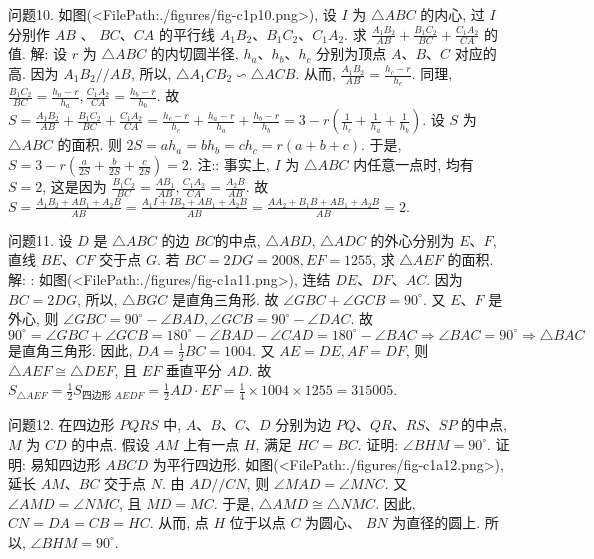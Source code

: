 问题10. 如图(<FilePath:./figures/fig-c1p10.png>), 设 $I$ 为 $\triangle A B C$ 的内心, 过 $I$ 分别作 $A B$ 、 $B C 、 C A$ 的平行线 $A_1 B_2 、 B_1 C_2 、 C_1 A_2$. 求 $\frac{A_1 B_2}{A B}+\frac{B_1 C_2}{B C}+\frac{C_1 A_2}{C A}$ 的值.
解: 设 $r$ 为 $\triangle A B C$ 的内切圆半径, $h_a 、 h_b 、 h_c$ 分别为顶点 $A 、 B 、 C$ 对应的高.
因为 $A_1 B_2 / / A B$, 所以, $\triangle A_1 C B_2 \backsim \triangle A C B$. 从而, $\frac{A_1 B_2}{A B}=\frac{h_c-r}{h_c}$. 同理, $\frac{B_1 C_2}{B C}=\frac{h_a-r}{h_a}, \frac{C_1 A_2}{C A}=\frac{h_b-r}{h_b}$. 故 $S=\frac{A_1 B_2}{A B}+\frac{B_1 C_2}{B C}+\frac{C_1 A_2}{C A}=\frac{h_c-r}{h_c}+ \frac{h_a-r}{h_a}+\frac{h_b-r}{h_b}=3-r\left(\frac{1}{h_c}+\frac{1}{h_a}+\frac{1}{h_b}\right)$. 设 $S$ 为 $\triangle A B C$ 的面积.
则 $2 S= a h_a=b h_b=c h_c=r(a+b+c)$. 于是, $S=3-r\left(\frac{a}{2 S}+\frac{b}{2 S}+\frac{c}{2 S}\right)=2$.
注:: 事实上, $I$ 为 $\triangle A B C$ 内任意一点时, 均有 $S=2$, 这是因为 $\frac{B_1 C_2}{B C}= \frac{A B_1}{A B}, \frac{C_1 A_2}{C A}=\frac{A_2 B}{A B}$. 故 $S=\frac{A_1 B_2+A B_1+A_2 B}{A B}=\frac{A_1 I+I B_2+A B_1+A_2 B}{A B}= \frac{A A_2+B_1 B+A B_1+A_2 B}{A B}=2$.



问题11. 设 $D$ 是 $\triangle A B C$ 的边 $B C$的中点, $\triangle A B D$, $\triangle A D C$ 的外心分别为 $E 、 F$, 直线 $B E 、 C F$ 交于点 $G$. 若 $B C=2 D G=2008, E F=1255$, 求 $\triangle A E F$ 的面积.
解: : 如图(<FilePath:./figures/fig-c1a11.png>), 连结 $D E 、 D F 、 A C$. 因为 $B C= 2 D G$, 所以, $\triangle B G C$ 是直角三角形.
故 $\angle G B C+ \angle G C B=90^{\circ}$. 又 $E 、 F$ 是外心, 则 $\angle G B C=90^{\circ}- \angle B A D, \angle G C B=90^{\circ}-\angle D A C$. 故 $90^{\circ}=\angle G B C+ \angle G C B=180^{\circ}-\angle B A D-\angle C A D=180^{\circ}- \angle B A C \Rightarrow \angle B A C=90^{\circ} \Rightarrow \triangle B A C$ 是直角三角形.
因此, $D A=\frac{1}{2} B C=1004$. 又 $A E=D E, A F=D F$, 则 $\triangle A E F \cong \triangle D E F$, 且 $E F$ 垂直平分 $A D$. 故 $S_{\triangle A E F}=\frac{1}{2} S_{\text {四边形 } A E D F}=\frac{1}{2} A D \cdot E F=\frac{1}{4} \times 1004 \times 1255=315005$.



问题12. 在四边形 $P Q R S$ 中, $A 、 B 、 C 、 D$ 分别为边 $P Q 、 Q R 、 R S 、 S P$ 的中点, $M$ 为 $C D$ 的中点.
假设 $A M$ 上有一点 $H$, 满足 $H C=B C$. 证明: $\angle B H M= 90^{\circ}$.
证明: 易知四边形 $A B C D$ 为平行四边形.
如图(<FilePath:./figures/fig-c1a12.png>), 延长 $A M 、 B C$ 交于点 $N$. 由 $A D / / C N$, 则 $\angle M A D=\angle M N C$. 又 $\angle A M D=\angle N M C$, 且 $M D=M C$. 于是, $\triangle A M D \cong \triangle N M C$. 因此, $C N=D A=C B=H C$. 从而, 点 $H$ 位于以点 $C$ 为圆心、 $B N$ 为直径的圆上.
所以, $\angle B H M=90^{\circ}$.



